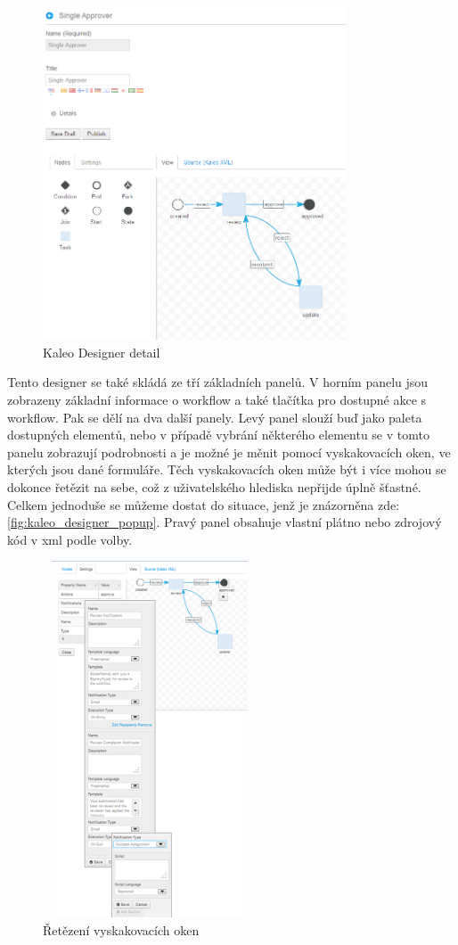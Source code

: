\documentclass{fithesis}
\begin{document}
\begin{figure}[htp]
\centering
\includegraphics[width=340px]{images/kaleo_designer_detail.png}
\caption{Kaleo Designer detail}
\label{fig:kaleo_designer}
\end{figure}

Tento designer se také skládá ze tří základních panelů. V horním panelu jsou zobrazeny základní informace o workflow a také tlačítka pro dostupné akce s workflow. Pak se dělí na dva další panely. Levý panel slouží buď jako paleta dostupných elementů, nebo v případě vybrání některého elementu se v tomto panelu zobrazují podrobnosti a je možné je měnit pomocí vyskakovacích oken, ve kterých jsou dané formuláře. Těch vyskakovacích oken může být i více mohou se dokonce řetězit na sebe, což z uživatelského hlediska nepřijde úplně šťastné. Celkem jednoduše se můžeme dostat do situace, jenž je znázorněna zde: \autoref{fig:kaleo_designer_popup}.  Pravý panel obsahuje vlastní plátno nebo zdrojový kód v xml podle volby.

\begin{figure}[htp]
\centering
\includegraphics[width=240px, height=400px]{images/kaleo_designer_popup.png}
\caption{Řetězení vyskakovacích oken}
\label{fig:kaleo_designer_popup}
\end{figure}
\end{document}
